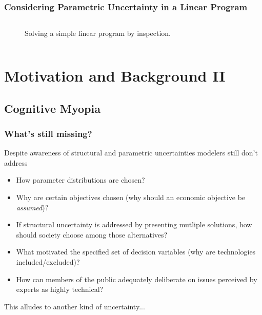 

\begin{frame}
    \frametitle{Considering Parametric Uncertainty in a Linear Program}
    \begin{columns}
        \column[t]{10cm}
        \begin{figure}
            \centering
            \resizebox{0.75\columnwidth}{!}{}
            \caption{Solving a simple linear program by inspection.}
            \label{fig:param-uc}
        \end{figure}
    \end{columns}
\end{frame}







%
\section{Motivation and Background II}
\subsection{Cognitive Myopia}
\begin{frame}
    \frametitle{What's still missing?}

    Despite awareness of structural and parametric uncertainties modelers still
    don't address
    \begin{itemize}
        \item How parameter distributions are chosen?
        \item Why are certain objectives chosen (why should an economic
        objective be \textit{assumed})?
        \item If structural uncertainty is addressed by presenting mutliple solutions,
        how should society choose among those alternatives?
        \item What motivated the specified set of decision variables (why are
        technologies included/excluded)?
        \item How can members of the public adequately deliberate on issues perceived
        by experts as highly technical?
    \end{itemize}

    This alludes to another kind of uncertainty... 
\end{frame}

